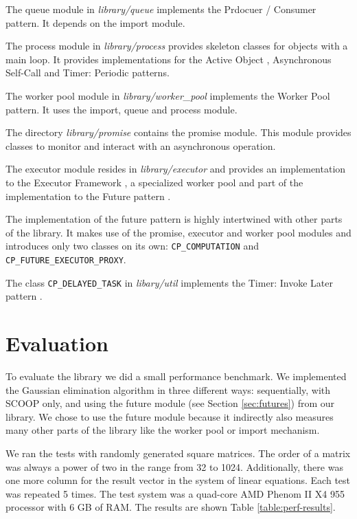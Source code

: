 \documentclass[a4paper,10pt]{article}
\newcommand{\dir}{\emph}
\begin{document}
The queue module in \dir{library/queue} implements the Prdocuer / Consumer  pattern.
It depends on the import module.

The process module in \dir{library/process} provides skeleton classes for objects with a main loop.
It provides implementations for the Active Object , Asynchronous Self-Call  and Timer: Periodic  patterns.

The worker pool module in \dir{library/worker\_pool} implements the Worker Pool  pattern.
It uses the import, queue and process module.

The directory \dir{library/promise} contains the promise module.
This module provides classes to monitor and interact with an asynchronous operation.

The executor module resides in \dir{library/executor} and provides an implementation to the Executor Framework , 
a specialized worker pool and part of the implementation to the Future pattern .

The implementation of the future pattern is highly intertwined with other parts of the library.
It makes use of the promise, executor and worker pool modules and introduces only two classes on its own:
\lstinline!CP_COMPUTATION! and \lstinline!CP_FUTURE_EXECUTOR_PROXY!.

The class \lstinline!CP_DELAYED_TASK! in \dir{libary/util} implements the Timer: Invoke Later pattern .



\section{Evaluation}
\label {sec:evaluation}

To evaluate the library we did a small performance benchmark.
We implemented the Gaussian elimination algorithm in three different ways: sequentially, with SCOOP only, and using the future module (see Section \ref{sec:futures}) from our library.
We chose to use the future module because it indirectly also measures many other parts of the library like the worker pool or import mechanism.

We ran the tests with randomly generated square matrices.
The order of a matrix was always a power of two in the range from 32 to 1024.
Additionally, there was one more column for the result vector in the system of linear equations.
Each test was repeated 5 times.
The test system was a quad-core AMD Phenom II X4 955 processor with 6 GB of RAM.
The results are shown Table \ref{table:perf-results}.
\end{document}
